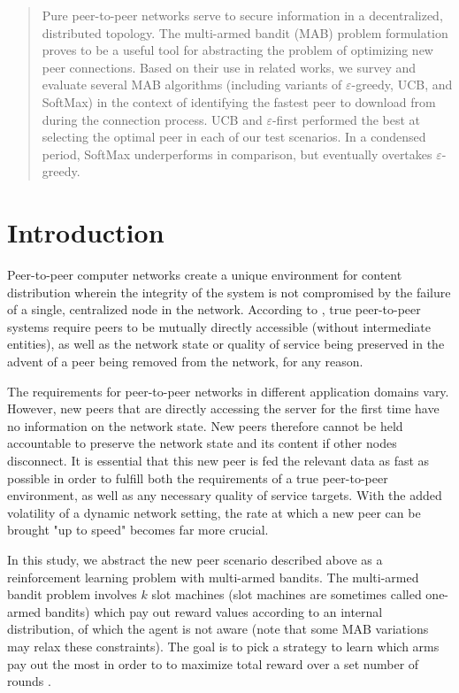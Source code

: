 \documentclass{article}
\begin{document}
\begin{abstract}
Pure peer-to-peer networks serve to secure information in a decentralized, distributed topology. The multi-armed bandit (MAB) problem formulation proves to be a useful 
tool for abstracting the problem of optimizing new peer connections. Based on their use in related works, we survey and evaluate several MAB algorithms (including 
variants of $\varepsilon$-greedy, UCB, and SoftMax) in the context of identifying the fastest peer to download from during the connection process. UCB and 
$\varepsilon$-first performed the best at selecting the optimal peer in each of our test scenarios. In a condensed period, SoftMax underperforms in comparison, 
but eventually overtakes $\varepsilon$-greedy. 

\end{abstract}

\section{Introduction}
Peer-to-peer computer networks create a unique environment for content distribution wherein the integrity of the system is not compromised by the failure of 
a single, centralized node in the network. According to \cite{p2p_def}, true peer-to-peer systems require peers to be mutually directly accessible (without 
intermediate entities), as well as the network state or quality of service being preserved in the advent of a peer being removed from the network, for any 
reason.

The requirements for peer-to-peer networks in different application domains vary. However, new peers that are directly accessing the server for the first time 
have no information on the network state. New peers therefore cannot be held accountable to preserve the network state and its content if other nodes disconnect. 
It is essential that this new peer is fed the relevant data as fast as possible in order to fulfill both the requirements of a true peer-to-peer environment, as 
well as any necessary quality of service targets. With the added volatility of a dynamic network setting, the rate at which a new peer can be brought "up to speed" 
becomes far more crucial.

In this study, we abstract the new peer scenario described above as a reinforcement learning problem with multi-armed bandits. The multi-armed bandit problem 
involves $k$ slot machines (slot machines are sometimes called one-armed bandits) which pay out reward values according to an internal distribution, of which the agent 
is not aware (note that some MAB variations may relax these constraints). The goal is to pick a strategy to learn which arms pay out the most in order to to maximize 
total reward over a set number of rounds \cite{mab_algos}. 
\end{document}
